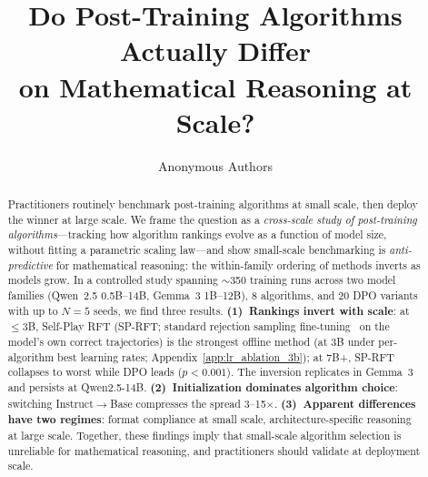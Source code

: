 \documentclass{article}
\title{Do Post-Training Algorithms Actually Differ\\ on Mathematical Reasoning at Scale?}
\author{
  Anonymous Authors
}
\newcommand{\sprft}{SP-RFT}
\begin{document}
\maketitle

\begin{abstract}
Practitioners routinely benchmark post-training algorithms at small scale, then deploy the winner at large scale.
We frame the question as a \emph{cross-scale study of post-training algorithms}---tracking how algorithm rankings evolve as a function of model size, without fitting a parametric scaling law---and show small-scale benchmarking is \emph{anti-predictive} for mathematical reasoning: the within-family ordering of methods inverts as models grow.
In a controlled study spanning ${\sim}$350 training runs across two model families (Qwen~2.5 0.5B--14B, Gemma~3 1B--12B), 8 algorithms, and 20 DPO variants with up to $N{=}5$ seeds, we find three results.
\textbf{(1)~Rankings invert with scale}: at $\leq$3B, Self-Play RFT (\sprft{}; standard rejection sampling fine-tuning~\citep{yuan2023rft} on the model's own correct trajectories) is the strongest offline method (at 3B under per-algorithm best learning rates; Appendix~\ref{app:lr_ablation_3b}); at 7B+, \sprft{} collapses to worst while DPO leads ($p < 0.001$). The inversion replicates in Gemma~3 and persists at Qwen2.5-14B.
\textbf{(2)~Initialization dominates algorithm choice}: switching Instruct$\to$Base compresses the spread 3--15$\times$.
\textbf{(3)~Apparent differences have two regimes}: format compliance at small scale, architecture-specific reasoning at large scale.
Together, these findings imply that small-scale algorithm selection is unreliable for mathematical reasoning, and practitioners should validate at deployment scale.
\end{abstract}
\end{document}
